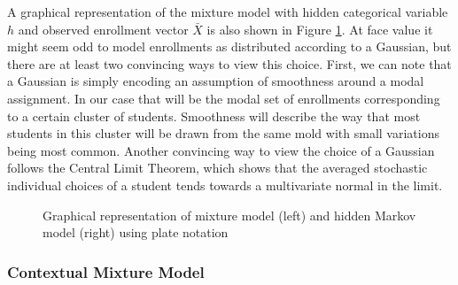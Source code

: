 \documentclass{edm_template}
\begin{document}
A graphical representation of the mixture model with hidden categorical variable $h$ and observed enrollment vector $\bar{X}$ is also shown in Figure \ref{fig:mixture_model}. At face value it might seem odd to model enrollments as distributed according to a Gaussian, but there are at least two convincing ways to view this choice. First, we can note that a Gaussian is simply encoding an assumption of smoothness around a modal assignment. In our case that will be the modal set of enrollments corresponding to a certain cluster of students. Smoothness will describe the way that most students in this cluster will be drawn from the same mold with small variations being most common. Another convincing way to view the choice of a Gaussian follows the Central Limit Theorem, which shows that the averaged stochastic individual choices of a student tends towards a multivariate normal in the limit.

\begin{figure}
	\centering
	\caption{\label{fig:mixture_model} Graphical representation of mixture model (left) and hidden Markov model (right) using plate notation}
\end{figure}

\pagebreak
\subsubsection{Contextual Mixture Model}
\label{section:cmm}
\end{document}

